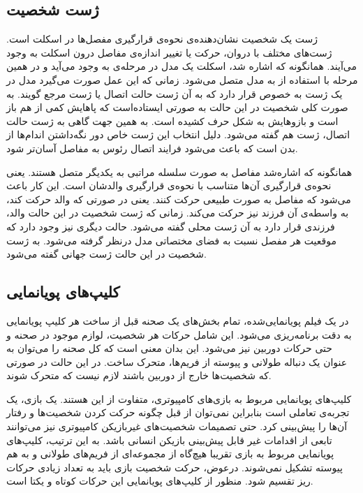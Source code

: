 \subsection{ژست شخصیت}

ژست یک شخصیت نشان‌دهنده‌ی نحوه‌ی قرارگیری مفصل‌ها در اسکلت است. ژست‌های مختلف با دروان، حرکت یا تغییر اندازه‌ی مفاصل درون اسکلت به وجود می‌‌آیند.
همانگونه که اشاره شد، اسکلت یک مدل در مرحله‌ی 
به وجود می‌‌آید و در همین مرحله با استفاده از 
 به مدل متصل می‌شود. زمانی که این عمل صورت می‌گیرد مدل در یک ژست به خصوص قرار دارد که به آن ژست حالت اتصال
یا
ژست مرجع
گویند.
به صورت کلی شخصیت در این حالت به صورتی ایستاده‌است که پاهایش کمی از هم باز است و 
بازو‌هایش به شکل حرف
کشیده است. به همین جهت گاهی به ژست حالت اتصال،
ژست
هم گفته می‌شود.
دلیل انتخاب این ژست خاص دور نگه‌داشتن اندام‌ها از بدن است که باعث می‌شود
فرایند اتصال رئوس به مفاصل آسان‌تر شود.

همانگونه که اشاره‌‌شد مفاصل به صورت سلسله مراتبی به یکدیگر متصل هستند. یعنی نحوه‌ی 
قرارگیری آن‌ها متناسب با نحوه‌ی قرارگیری والدشان است.
این کار باعث می‌شود که مفاصل به صورت طبیعی حرکت کنند. یعنی در صورتی که والد حرکت کند، به واسطه‌ی 
آن فرزند نیز حرکت می‌کند.
زمانی که ژست شخصیت در این حالت والد، فرزندی قرار دارد به آن ژست محلی
گفته می‌شود. حالت دیگری نیز وجود دارد که موقعیت هر مفصل نسبت به فضای مختصاتی مدل 
درنظر گرفته می‌شود. به ژست شخصیت در این حالت ژست جهانی
گفته می‌شود.
\cite{GameEngineArchitecture}

\subsection{‌کلیپ‌های پویانمایی}

در یک فیلم پویانمایی‌شده، تمام بخش‌های یک صحنه قبل از ساخت هر کلیپ پویانمایی به دقت برنامه‌ریزی می‌شود.
این شامل حرکات هر شخصیت، لوازم موجود در صحنه و حتی حرکات دوربین نیز می‌شود.
این بدان معنی است که کل صحنه را می‌توان به عنوان یک دنباله طولانی و پیوسته از فریم‌ها، متحرک ساخت.
در این حالت در صورتی که شخصیت‌ها خارج از دوربین باشند لازم نیست که متحرک شوند.

کلیپ‌های پویانمایی مربوط به بازی‌های کامپیوتری، متفاوت از این هستند. یک بازی، یک تجربه‌ی تعاملی است بنابراین نمی‌توان از قبل چگونه حرکت کردن شخصیت‌ها و رفتار آن‌ها را پیش‌بینی کرد.
حتی تصمیمات شخصیت‌های غیربازیکن کامپیوتری نیز می‌توانند تابعی از اقدامات غیر قابل پیش‌بینی بازیکن انسانی باشد.
به این ترتیب، کلیپ‌های پویانمایی مربوط به بازی تقریبا هیچ‌گاه از مجموعه‌ای از فریم‌های طولانی و به هم پیوسته تشکیل نمی‌شوند.
درعوض، حرکت شخصیت بازی باید به تعداد زیادی حرکات ریز تقسیم شود. 
منظور از کلیپ‌های پویانمایی این حرکات کوتاه و یکتا است.

